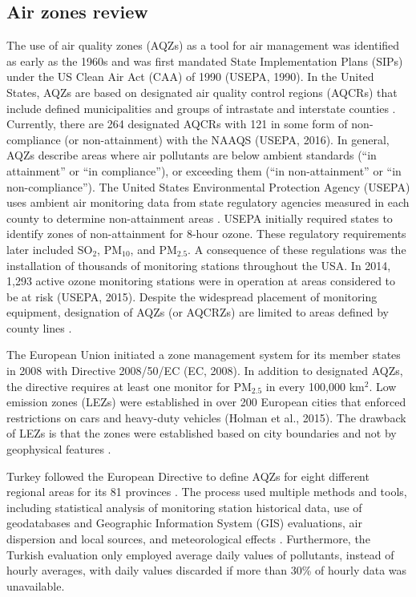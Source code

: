 \subsection{Air zones review}
The use of air quality zones (AQZs) as a tool for air management was identified as early as the 1960s \citep{Breivogel1961, Holland1960} and was first mandated State Implementation Plans (SIPs) under the US Clean Air Act (CAA) of 1990 (USEPA, 1990). In the United States, AQZs are based on designated air quality control regions (AQCRs) that include defined municipalities and groups of intrastate and interstate counties \citep{USEPA1970a}. Currently, there are 264 designated AQCRs with 121 in some form of non-compliance (or non-attainment) with the NAAQS (USEPA, 2016). In general, AQZs describe areas where air pollutants are below ambient standards (“in attainment” or “in compliance”), or exceeding them (“in non-attainment” or “in non-compliance”).  The United States Environmental Protection Agency (USEPA) uses ambient air monitoring data from state regulatory agencies measured in each county to determine non-attainment areas \citep{Carr2012}.  USEPA initially required states to identify zones of non-attainment for 8-hour ozone.  These regulatory requirements later included SO$_{2}$, PM$_{10}$, and PM$_{2.5}$.  A consequence of these regulations was the installation of thousands of monitoring stations throughout the USA.  In 2014, 1,293 active ozone monitoring stations were in operation at areas considered to be at risk (USEPA, 2015).  Despite the widespread placement of monitoring equipment, designation of AQZs (or AQCRZs) are limited to areas defined by county lines \citep{Carr2012}.

The European Union initiated a zone management system for its member states in 2008 with Directive 2008/50/EC (EC, 2008).  In addition to designated AQZs, the directive requires at least one monitor for PM$_{2.5}$ in every 100,000 km$^{2}$.  Low emission zones (LEZs) were established in over 200 European cities that enforced restrictions on cars and heavy-duty vehicles (Holman et al., 2015).  The drawback of LEZs is that the zones were established based on city boundaries and not by geophysical features \citep{Henschel2013}.

Turkey followed the European Directive to define AQZs for eight different regional areas for its 81 provinces \citep{CYGM2010}.  The process used multiple methods and tools, including statistical analysis of monitoring station historical data, use of geodatabases and Geographic Information System (GIS) evaluations, air dispersion and local sources, and meteorological effects \citep{Karaca2012}.  Furthermore, the Turkish evaluation only employed average daily values of pollutants, instead of hourly averages, with daily values discarded if more than 30\% of hourly data was unavailable.  

